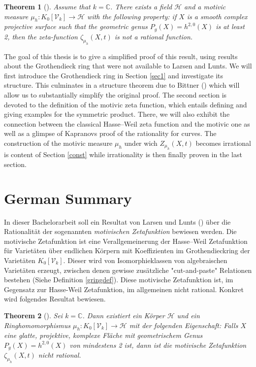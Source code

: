 \documentclass[11pt, a4paper, german, twoside]{article}
\theoremstyle{plain}
\newtheorem{theorem}{Theorem}[section]
\theoremstyle{definition}
\newcommand{\gring}[1][k]{K_0[\mathcal{V}_#1]}
\begin{document}
\begin{theorem}[{\cite[Thm. 1.6]{MR1996804}}]
\label{irrational}
Assume that $k = \mathbb{C}$. There exists a field $\mathcal{H}$ and a motivic measure $\mu_h \colon \gring \to \mathcal{H}$ with the following
property: if $X$ is a smooth complex projective surface such that the geometric genus $P_g(X)=h^{2,0}(X)$ is at least 2, 
then the zeta-function $\zeta_{\mu_h}(X,t)$ is not a rational function.
\end{theorem}

The goal of this thesis is to give a simplified proof of this result, using results about the Grothendieck ring that were not available
to Larsen and Lunts.
We will first introduce the Grothendieck ring in Section \ref{sec1} and investigate its structure. 
This culminates in a structure theorem due to Bittner (\cite[Thm 3.1]{Bittner}) which will allow us to substantially simplify the original 
proof.
The second section is devoted to the definition of the motivic zeta function, which entails defining and giving examples for the symmetric 
product. There, we will also exhibit the connection between the classical Hasse--Weil zeta function and the motivic one as well as a glimpse of
Kapranovs proof of the rationality for curves.
The construction of the motivic measure $\mu_h$ under wich $Z_{\mu_h}(X,t)$ becomes irrational is content of Section \ref{const} while irrationality
is then finally proven in the last section.

\section{German Summary}
In dieser Bachelorarbeit soll ein Resultat von Larsen und Lunts (\cite{MR1996804}) über die Rationalität der sogenannten 
\emph{motivischen Zetafunktion}
bewiesen werden. Die motivische Zetafunktion ist eine Verallgemeinerung der Hasse--Weil Zetafunktion für Varietäten über endlichen Körpern
mit Koeffizienten im Grothendieckring der Varietäten $\gring[k]$. Dieser wird von Isomorphieklassen von algebraischen Varietäten erzeugt, 
zwischen denen gewisse zusätzliche "cut-and-paste" Relationen bestehen (Siehe Definition \ref{gringdef}). 
Diese motivische Zetafunktion ist, im Gegensatz zur Hasse-Weil Zetafunktion, im allgemeinen nicht rational. 
Konkret wird folgendes Resultat bewiesen.
\begin{theorem}[{\cite[Thm. 1.6]{MR1996804}}]
Sei $k = \mathbb{C}$. Dann existiert ein Körper $\mathcal{H}$ und ein Ringhomomorphismus $\mu_h \colon \gring \to \mathcal{H}$ mit der folgenden
Eigenschaft: Falls $X$ eine glatte, projektive, komplexe Fläche mit geometrischem Genus $P_g(X) = h^{2,0}(X)$ von mindestens 2 ist, dann ist die
motivische Zetafunktion $\zeta_{\mu_h}(X,t)$ nicht rational.
\end{theorem}
\end{document}
